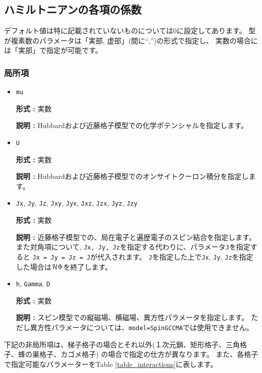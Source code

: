 \subsection{ハミルトニアンの各項の係数}

デフォルト値は特に記載されていないものについては0に設定してあります。
型が複素数のパラメータは「実部, 虚部」(間に``,'')の形式で指定し、
実数の場合には「実部」で指定が可能です。

\subsubsection{局所項}

\begin{itemize}

\item \verb|mu|

{\bf 形式 :} 実数

{\bf 説明 :} Hubbardおよび近藤格子模型での化学ポテンシャルを指定します。

\item \verb|U|

{\bf 形式 :} 実数

{\bf 説明 :} Hubbardおよび近藤格子模型でのオンサイトクーロン積分を指定します。

\item \verb|Jx|, \verb|Jy|, \verb|Jz|, \verb|Jxy|, 
  \verb|Jyx|, \verb|Jxz|, \verb|Jzx|, \verb|Jyz|, \verb|Jzy|

{\bf 形式 :} 実数

{\bf 説明 :} 近藤格子模型での、局在電子と遍歴電子のスピン結合を指定します。
また対角項について, \verb|Jx, Jy, Jz|を指定する代わりに、パラメータ\verb|J|を指定すると
\verb|Jx = Jy = Jz = J|が代入されます。
\verb|J|を指定した上で\verb|Jx|, \verb|Jy|, \verb|Jz|を指定した場合は$\mathcal{H} \Phi$を終了します。

\item \verb|h|, \verb|Gamma|, \verb|D|

{\bf 形式 :} 実数

{\bf 説明 :} スピン模型での縦磁場、横磁場、異方性パラメータを指定します。
ただし異方性パラメータについては、\verb|model=SpinGCCMA|では使用できません。

\end{itemize}

下記の非局所項は、梯子格子の場合とそれ以外(１次元鎖、矩形格子、三角格子、蜂の巣格子、カゴメ格子)
の場合で指定の仕方が異なります。
また、各格子で指定可能なパラメーターをTable \ref{table_interactions}に表します。

